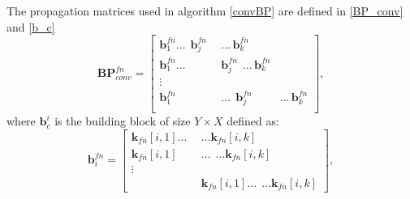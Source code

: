 \documentclass[10pt,twocolumn,letterpaper]{article}
\begin{document}
The propagation matrices used in algorithm \ref{convBP} are defined in \eqref{BP_conv} and \eqref{b_c}\begin{equation}
\label{BP_conv}
\mathbf{BP}_{conv}^{fn}=\left[
\begin{aligned}
\mathbf{b}_1^{fn} \dots\ \  \mathbf{b}_j^{fn}  \ \ & \dots \,\mathbf{b}_k^{fn}  \\
\mathbf{b}_1^{fn} \dots\ \  &\mathbf{b}_j^{fn}  \ \  \dots \,\mathbf{b}_k^{fn}  \\
\vdots \\
\mathbf{b}_1^{fn} &\dots\ \  \mathbf{b}_j^{fn}  \ \ & \dots \,\mathbf{b}_k^{fn}  \\
\end{aligned}
\right],
\end{equation}
where $\mathbf{b}_c^i$ is the building block of size $Y \times X$ defined as:
\begin{equation}
\label{b_c}
\mathbf{b}_{i}^{fn}=\left[
\begin{aligned}
\mathbf{k}_{fn}[i,1] \dots\ \  & \dots \mathbf{k}_{fn}[i,k]   \\
\mathbf{k}_{fn}[i,1]&\dots \ \  \dots \mathbf{k}_{fn}[i,k]  \\
\vdots \\
&\mathbf{k}_{fn}[i,1]  \dots\ \   \dots \mathbf{k}_{fn}[i,k] 
\end{aligned}
\right],
\end{equation}
\end{document}
